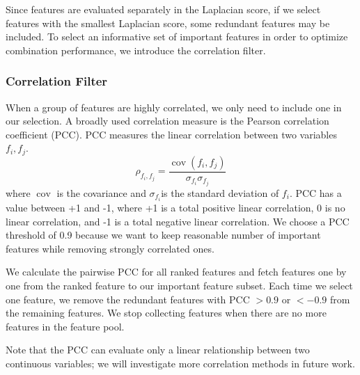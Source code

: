 Since features are evaluated separately in the Laplacian score, if we select features with the smallest Laplacian score, some redundant features may be included. To select an informative set of important features in order to optimize combination performance, we introduce the correlation filter.

\subsubsection{Correlation Filter}
When a group of features are highly correlated, we only need to include one in our selection. A broadly used correlation measure is the Pearson correlation coefficient (PCC). PCC measures the linear correlation between two variables $f_{i}, f_{j}$. 
\begin{equation}
\rho_{f_{i}, f_{j}}=\frac{\operatorname{cov}(f_{i}, f_{j})}{\sigma_{f_{i}} \sigma_{f_{j}}}
\end{equation}
where $\operatorname{cov}$ is the covariance and $\sigma_{f_{i}}$is the standard deviation of $f_{i}$.
PCC has a value between +1 and -1, where +1 is a total positive linear correlation, 0 is no linear correlation, and -1 is a total negative linear correlation. We choose a PCC threshold of 0.9 because we want to keep reasonable number of important features while removing strongly correlated ones.  

We calculate the pairwise PCC for all ranked features and fetch features one by one from the ranked feature to our important feature subset. Each time we select one feature, we remove the redundant features with PCC $> 0.9$ or $< -0.9$ from the remaining features. We stop collecting features when there are no more features in the feature pool. %

Note that the PCC can evaluate only a linear relationship between two continuous variables; we will investigate more correlation methods in future work.